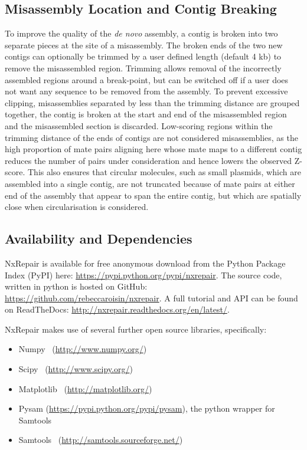\subsection*{Misassembly Location and Contig Breaking}
To improve the quality of the \textit{de novo} assembly, a contig is broken into two separate pieces at the site of a misassembly. The broken ends of the two new contigs can optionally be trimmed by a user defined length (default 4 kb) to remove the misassembled region. Trimming allows removal of the incorrectly assembled regions around a break-point, but can be switched off if a user does not want any sequence to be removed from the assembly. To prevent excessive clipping, misassemblies separated by less than the trimming distance are grouped together, the contig is broken at the start and end of the misassembled region and the misassembled section is discarded. Low-scoring regions within the trimming distance of the ends of contigs are not considered misassemblies, as the high proportion of mate pairs aligning here whose mate maps to a different contig reduces the number of pairs under consideration and hence lowers the observed Z-score. This also ensures that circular molecules, such as small plasmids, which are assembled into a single contig, are not truncated because of mate pairs at either end of the assembly that appear to span the entire contig, but which are spatially close when circularisation is considered.

\subsection*{Availability and Dependencies}
NxRepair is available for free anonymous download from the Python Package Index (PyPI) here: \url{https://pypi.python.org/pypi/nxrepair}.
The source code, written in python is hosted on GitHub: \url{https://github.com/rebeccaroisin/nxrepair}.
A full tutorial and API can be found on ReadTheDocs: \url{http://nxrepair.readthedocs.org/en/latest/}.

NxRepair makes use of several further open source libraries, specifically:

\begin{itemize}
\item[] Numpy~\cite{numpy} (\url{http://www.numpy.org/})
\item[] Scipy~\cite{scipy} (\url{http://www.scipy.org/})
\item[] Matplotlib~\cite{Hunter2007} (\url{http://matplotlib.org/})
\item[] Pysam (\url{https://pypi.python.org/pypi/pysam}), the python wrapper for Samtools
\item[] Samtools~\cite{li2009} (\url{http://samtools.sourceforge.net/})
\end{itemize}

